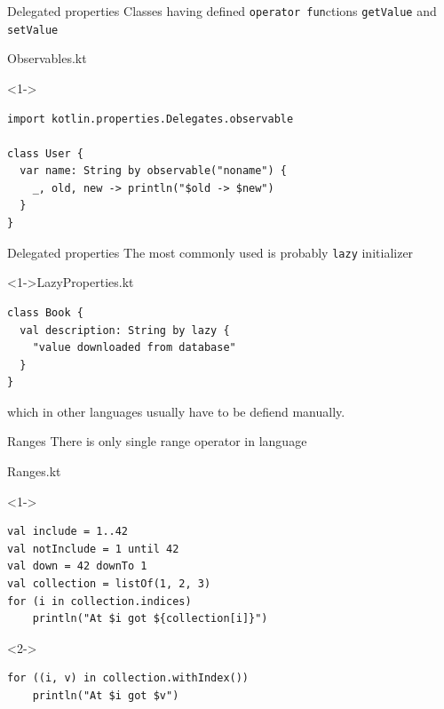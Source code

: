\documentclass[hyperref={pdfpagelabels=false},xcolor={dvipsnames},compress]{beamer}
\begin{document}
    \begin{frame}[fragile]{Delegated properties}
        Classes having defined \texttt{operator fun}ctions \texttt{getValue} and \texttt{setValue}
        \begin{exampleblock}{Observables.kt}
            \begin{onlyenv}<1->
                \begin{lstlisting}
import kotlin.properties.Delegates.observable

class User {
  var name: String by observable("noname") {
    _, old, new -> println("$old -> $new")
  }
}
                \end{lstlisting}
            \end{onlyenv}
        \end{exampleblock}
    \end{frame}

    \begin{frame}[fragile]{Delegated properties}
        The most commonly used is probably \texttt{lazy} initializer
        \begin{exampleblock}
            <1->{LazyProperties.kt}
            \begin{onlyenv}
                \begin{lstlisting}
class Book {
  val description: String by lazy {
    "value downloaded from database"
  }
}
                \end{lstlisting}
            \end{onlyenv}
        \end{exampleblock}
        which in other languages usually have to be defiend manually.
    \end{frame}

    \begin{frame}[fragile]{Ranges}
        There is only single range operator in language
        \begin{exampleblock}{Ranges.kt}
            \begin{onlyenv}<1->
                \begin{lstlisting}
val include = 1..42
val notInclude = 1 until 42
val down = 42 downTo 1
val collection = listOf(1, 2, 3)
for (i in collection.indices)
	println("At $i got ${collection[i]}")
                \end{lstlisting}
            \end{onlyenv}
            \begin{onlyenv}<2->
                \begin{lstlisting}
for ((i, v) in collection.withIndex())
	println("At $i got $v")
                \end{lstlisting}
            \end{onlyenv}
        \end{exampleblock}
    \end{frame}
\end{document}
